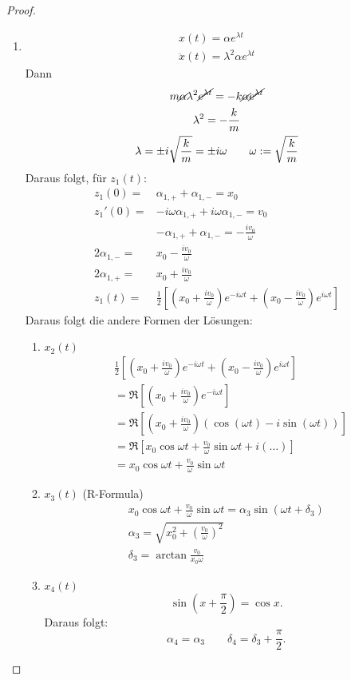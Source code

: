 \begin{proof}
\begin{enumerate}
		\item 
			\begin{gather*}
				x(t)=\alpha e^{\lambda t}\\
				\ddot{x}(t)=\lambda^2 \alpha e^{\lambda t}
			\end{gather*}
			Dann
			\begin{gather*}
				m\cancel\alpha\lambda^2 \cancel{e^{\lambda t}}=-k\cancel\alpha \cancel{e^{\lambda t}}\\
				\lambda^2=-\frac{k}{m}\\
				\lambda=\pm i\sqrt{\frac{k}{m}}=\pm i\omega \qquad \omega :=\sqrt{\frac{k}{m}}    
			\end{gather*}
			Daraus folgt, f\"{u}r $z_1(t)$:
\begin{align*}
	z_1(0)=&\alpha_{1,+}+\alpha_{1,-}=x_0\\
	z_1'(0)=&-i\omega \alpha_{1,+}+i\omega \alpha_{1,-}=v_0\\
		&-\alpha_{1,+}+\alpha_{1,-}=-\frac{iv_0}{\omega}\\
	2\alpha_{1,-}=&x_0-\frac{iv_0}{\omega}\\
	2\alpha_{1,+}=&x_0+\frac{iv_0}{\omega}\\
	z_1(t)=& \frac{1}{2}\left[ \left( x_0+\frac{iv_0}{\omega} \right) e^{-i\omega t}+\left( x_0-\frac{iv_0}{\omega} \right) e^{i\omega t} \right] 
\end{align*}
Daraus folgt die andere Formen der L\"{o}sungen:
\begin{enumerate}[label=(\roman*)]
	\item $x_2(t)$ 
		\begin{align*}
			&\frac{1}{2}\left[ \left( x_0+\frac{iv_0}{\omega} \right)e^{-i\omega t}+\left( x_0-\frac{iv_0}{\omega} \right) e^{i\omega t}  \right] \\
			&= \Re\left[ \left( x_0+\frac{iv_0}{\omega} \right) e^{-i\omega t} \right] \\
			&=\Re\left[ \left( x_0+\frac{iv_0}{\omega} \right) \left( \cos(\omega t)-i\sin(\omega t) \right)  \right] \\
			&=\Re\left[ x_0\cos\omega t+\frac{v_0}{\omega}\sin\omega t+i(\dots) \right] \\
			&= x_0\cos\omega t+\frac{v_0}{\omega}\sin\omega t
		\end{align*}
	\item $x_3(t)$ 
		(R-Formula)
		\begin{gather*}
			x_0\cos\omega t+\frac{v_0}{\omega}\sin\omega t=\alpha_3 \sin(\omega t+\delta_3)\\
			\alpha_3=\sqrt{x_0^2+\left( \frac{v_0}{\omega} \right) ^2} \\
			\delta_3=\arctan \frac{v_0}{x_0\omega}
		\end{gather*}
	\item $x_4(t)$ 
		\[
		\sin\left( x+\frac{\pi}{2} \right) =\cos x
		.\] 
		Daraus folgt:
		\[
		\alpha_4=\alpha_3 \qquad \delta_4=\delta_3+\frac{\pi}{2}
		.\] 
\end{enumerate}
	\end{enumerate}
\end{proof}

